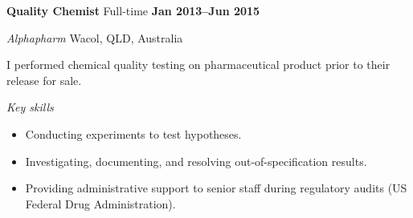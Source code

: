 \textbf{\large Quality Chemist} \hfill Full-time \textbf{Jan 2013--Jun 2015}\par
\vspace{1mm}
\textit{Alphapharm} \hfill Wacol, QLD, Australia\par
\vspace{1mm}
I performed chemical quality testing on pharmaceutical product prior to their release for sale.\par
\vspace{2mm}
\textit{Key skills} \par
\begin{itemize}
	\item Conducting experiments to test hypotheses.
	\item Investigating, documenting, and resolving out-of-specification results.
    \item Providing administrative support to senior staff during regulatory audits (US Federal Drug Administration).
\end{itemize}\par